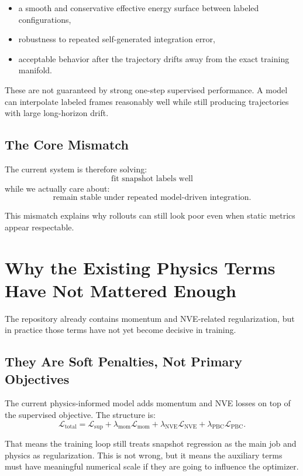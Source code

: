 \documentclass[11pt]{article}
\begin{document}
\begin{itemize}
  \item a smooth and conservative effective energy surface between labeled configurations,
  \item robustness to repeated self-generated integration error,
  \item acceptable behavior after the trajectory drifts away from the exact training manifold.
\end{itemize}

These are not guaranteed by strong one-step supervised performance. A model can interpolate labeled frames reasonably well while still producing trajectories with large long-horizon drift.

\subsection{The Core Mismatch}

The current system is therefore solving:
\[
\text{fit snapshot labels well}
\]
while we actually care about:
\[
\text{remain stable under repeated model-driven integration.}
\]

This mismatch explains why rollouts can still look poor even when static metrics appear respectable.

\section{Why the Existing Physics Terms Have Not Mattered Enough}

The repository already contains momentum and NVE-related regularization, but in practice those terms have not yet become decisive in training.

\subsection{They Are Soft Penalties, Not Primary Objectives}

The current physics-informed model adds momentum and NVE losses on top of the supervised objective. The structure is:
\[
\mathcal{L}_{\text{total}}
=
\mathcal{L}_{\text{sup}}
+
\lambda_{\text{mom}} \mathcal{L}_{\text{mom}}
+
\lambda_{\text{NVE}} \mathcal{L}_{\text{NVE}}
+
\lambda_{\text{PBC}} \mathcal{L}_{\text{PBC}}.
\]

That means the training loop still treats snapshot regression as the main job and physics as regularization. This is not wrong, but it means the auxiliary terms must have meaningful numerical scale if they are going to influence the optimizer.
\end{document}
